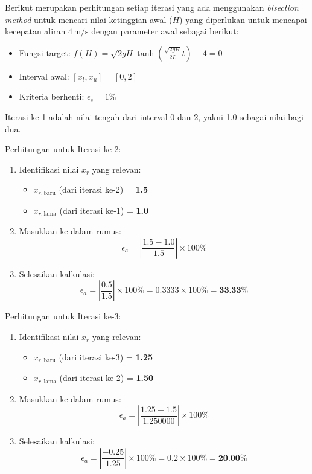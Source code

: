 \documentclass[conference]{IEEEtran}
\begin{document}
Berikut merupakan perhitungan setiap iterasi yang ada menggunakan \textit{bisection method} untuk mencari nilai ketinggian awal ($H$) yang diperlukan untuk mencapai kecepatan aliran $4 \, \text{m/s}$ dengan parameter awal sebagai berikut:
\begin{itemize}
    \item Fungsi target: $f(H) = \sqrt{2gH} \tanh\left(\frac{\sqrt{2gH}}{2L}t\right) - 4 = 0$
    \item Interval awal: $[x_l, x_u] = [0, 2]$
    \item Kriteria berhenti: $\epsilon_s = 1\%$
\end{itemize}
Iterasi ke-1 adalah nilai tengah dari interval 0 dan 2, yakni 1.0 sebagai nilai bagi dua.

Perhitungan untuk Iterasi ke-2:
\begin{enumerate}
    \item Identifikasi nilai $x_r$ yang relevan:
    \begin{itemize}
        \item $x_{r, \text{baru}}$ (dari iterasi ke-2) = \textbf{1.5}
        \item $x_{r, \text{lama}}$ (dari iterasi ke-1) = \textbf{1.0}
    \end{itemize}
    
    \item Masukkan ke dalam rumus:
    \begin{equation}
    \epsilon_a = \left| \frac{1.5 - 1.0}{1.5} \right| \times 100\%
    \end{equation}
    
    \item Selesaikan kalkulasi:
    \begin{equation}
    \epsilon_a = \left| \frac{0.5}{1.5} \right| \times 100\% = 0.3333 \times 100\% = \textbf{33.33\%}
    \end{equation}
\end{enumerate}

Perhitungan untuk Iterasi ke-3:
\begin{enumerate}
    \item Identifikasi nilai $x_r$ yang relevan:
    \begin{itemize}
        \item $x_{r, \text{baru}}$ (dari iterasi ke-3) = \textbf{1.25}
        \item $x_{r, \text{lama}}$ (dari iterasi ke-2) = \textbf{1.50}
    \end{itemize}
    
    \item Masukkan ke dalam rumus:
    \begin{equation}
    \epsilon_a = \left| \frac{1.25 - 1.5}{1.250000} \right| \times 100\%
    \end{equation}
    
    \item Selesaikan kalkulasi:
    \begin{equation}
    \epsilon_a = \left| \frac{-0.25}{1.25} \right| \times 100\% = 0.2 \times 100\% = \textbf{20.00\%}
    \end{equation}
\end{enumerate}
\end{document}
